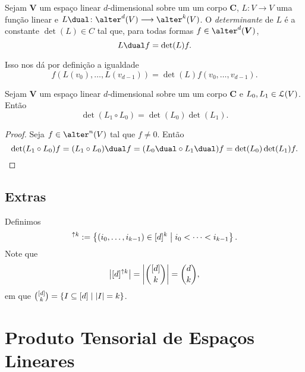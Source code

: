 \begin{defi}
Sejam $\bm V$ um espaço linear $d$-dimensional sobre um um corpo $\bm C$, $L\colon V \to V$ uma função linear e $L\dual\colon \alter^d(V) \to \alter^k(V)$. O \emph{determinante} de $L$ é a constante $\det(L) \in C$ tal que, para todas formas $f \in \alter^d(\bm V)$,
	\begin{equation*}
	L\dual f = \det(L) f.
	\end{equation*}
\end{defi}

Isso nos dá por definição a igualdade
	\begin{equation*}
	f(L(v_0),\ldots,L(v_{d-1})) = \det(L)f(v_0,\ldots,v_{d-1}).
	\end{equation*}

\begin{prop}
Sejam $\bm V$ um espaço linear $d$-dimensional sobre um um corpo $\bm C$ e $L_0,L_1 \in \mathcal{L}(V)$. Então
	\begin{equation*}
	\det(L_1 \circ L_0) = \det(L_0)\det(L_1).
	\end{equation*}
\end{prop}
\begin{proof}
Seja $f \in \alter^n(V)$ tal que $f \neq 0$. Então
	\begin{equation*}
	\det(L_1 \circ L_0)f = (L_1 \circ L_0)\dual f = ({L_0}\dual \circ {L_1}\dual) f = \det(L_0)\det(L_1) f.
	\end{equation*}
\end{proof}




\subsection{Extras}

Definimos
	\begin{equation*}
	[d]^{\uparrow k} := \set{(i_0,\ldots,i_{k-1}) \in [d]^k}{i_{0}<\cdots<i_{k-1}}.
	\end{equation*}
Note que
	\begin{equation*}
	\left\vert{[d]^{\uparrow k}}\right\vert = \left\vert{\binom{[d]}{k}}\right\vert = \binom{d}{k},
	\end{equation*}
em que $\binom{[d]}{k} = \left\{I \subseteq [d] \;\middle\vert\; \left\vert{I}\right\vert=k \right\}$.


\cleardoublepage





\section{Produto Tensorial de Espaços Lineares}

